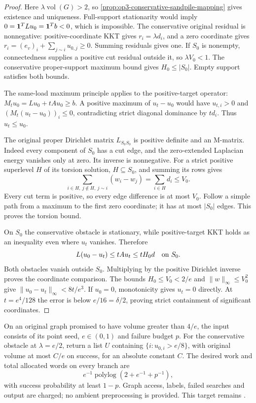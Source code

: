 \begin{proof}
Here $\lambda\operatorname{vol}(G)>2$, so
\cref{prop:op3-conservative-sandpile-mapping} gives existence and
uniqueness. Full-support stationarity would imply
$0=\mathbf{1}^TLu_0=\mathbf{1}^Tb<0$, which is impossible. The conservative
original residual is nonnegative: positive-coordinate KKT gives
$r_i=\lambda d_i$, and a zero coordinate gives
$r_i=(e_v)_i+\sum_{j\sim i}u_{0,j}\geq0$. Summing residuals gives
one. If $S_0$ is nonempty, connectedness supplies a positive cut
residual outside it, so $\lambda V_0<1$. The conservative proper-support
maximum bound gives $H_0\leq|S_0|$. Empty support satisfies both bounds.

The same-load maximum principle applies to the positive-target operator:
$M_tu_0=Lu_0+tAu_0\geq b$. A positive maximum of $u_t-u_0$ would
have $u_{t,i}>0$ and $(M_t(u_t-u_0))_i\leq0$, contradicting
strict diagonal dominance by $td_i$. Thus $u_t\leq u_0$.

The original proper Dirichlet matrix $L_{S_0S_0}$ is positive definite
and an M-matrix. Indeed every component of $S_0$ has a cut edge, and
the zero-extended Laplacian energy vanishes only at zero. Its inverse
is nonnegative. For a strict positive superlevel $H$ of its torsion
solution, $H\subseteq S_0$, and summing its rows gives
\[
 \sum_{i\in H,\ j\notin H,\ j\sim i}(w_i-w_j)
 =\sum_{i\in H}d_i\leq V_0.
\]
Every cut term is positive, so every edge difference is at most $V_0$.
Follow a simple path from a maximum to the first zero coordinate;
it has at most $|S_0|$ edges. This proves the torsion bound.

On $S_0$ the conservative obstacle is stationary, while positive-target
KKT holds as an inequality even where $u_t$ vanishes. Therefore
\[
 L(u_0-u_t)\leq tAu_t\leq tH_0d\quad\hbox{on }S_0.
\]
Both obstacles vanish outside $S_0$. Multiplying by the positive
Dirichlet inverse proves the coordinate comparison. The bounds
$H_0\leq V_0<2/e$ and $\|w\|_\infty\leq V_0^2$ give
$\|u_0-u_t\|_\infty<8t/e^3$. If $u_0=0$, monotonicity gives
$u_t=0$ directly. At $t=e^4/128$ the error is below
$e/16=\delta/2$, proving strict containment of significant coordinates.
\end{proof}

\begin{definition}
\label{def:op3-conservative-envelope-target}
On an original graph promised to have volume greater than $4/e$, the
input consists of its point seed, $e\in(0,1)$ and failure budget $p$.
For the conservative obstacle at $\lambda=e/2$, return a list $U$
containing $\{i:u_{0,i}>e/8\}$, with original volume at most $C/e$
on success, for an absolute constant $C$. The desired work and total
allocated words on every branch are
\[
 e^{-1}\operatorname{polylog}(2+e^{-1}+p^{-1}),
\]
with success probability at least $1-p$. Graph access, labels, failed
searches and output are charged; no ambient preprocessing is provided.
This target remains \statusopen.
\end{definition}

